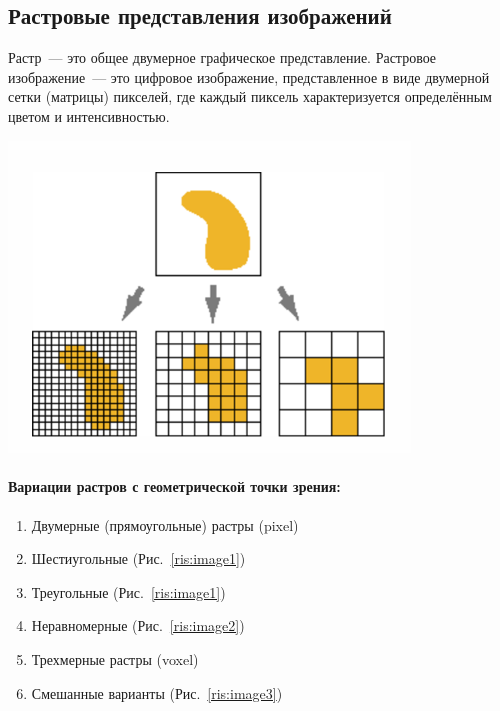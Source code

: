\subsection{Растровые представления изображений}
\label{base-section}
Растр~--- это общее двумерное графическое представление.
Растровое изображение~--- это цифровое изображение, представленное в виде двумерной сетки (матрицы) пикселей, где каждый пиксель характеризуется определённым цветом и интенсивностью.
\begin{center}
    \includegraphics[width=0.8\textwidth]{rastr.png}

\end{center}
\paragraph{Вариации растров с геометрической точки зрения:}
\begin{enumerate}
    \item Двумерные (прямоугольные) растры (pixel)
    \item Шестиугольные (Рис.~\ref{ris:image1})
    \item Треугольные (Рис.~\ref{ris:image1})
    \item Неравномерные (Рис.~\ref{ris:image2})
    \item Трехмерные растры (voxel)
    \item Смешанные варианты (Рис.~\ref{ris:image3})
\end{enumerate}

